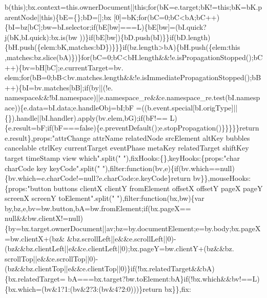 \begin{DoxyCode}
      b(\textcolor{keyword}{this});bx.context=this.ownerDocument||\textcolor{keyword}{this};\textcolor{keywordflow}{for}(bK=e.target;bK!=\textcolor{keyword}{this};bK=bK.parentNode||\textcolor{keyword}{this})\{bE=\{\};bD=[];bx
      [0]=bK;\textcolor{keywordflow}{for}(bC=0;bC<bA;bC++)\{bI=bz[bC];bw=bI.selector;\textcolor{keywordflow}{if}(bE[bw]===L)\{bE[bw]=(bI.quick?j(bK,bI.quick):bx.is(bw
      ))\}if(bE[bw])\{bD.push(bI)\}\}\textcolor{keywordflow}{if}(bD.length)\{bH.push(\{elem:bK,matches:bD\})\}\}\}\textcolor{keywordflow}{if}(bz.length>bA)\{bH.push(\{elem:\textcolor{keyword}{this}
      ,matches:bz.slice(bA)\})\}\textcolor{keywordflow}{for}(bC=0;bC<bH.length&&!e.isPropagationStopped();bC++)\{bv=bH[bC];e.currentTarget=bv.
      elem;\textcolor{keywordflow}{for}(bB=0;bB<bv.matches.length&&!e.isImmediatePropagationStopped();bB++)\{bI=bv.matches[bB];\textcolor{keywordflow}{if}(by||(!e.
      namespace&&!bI.namespace)||e.namespace\_re&&e.namespace\_re.test(bI.namespace))\{e.data=bI.data;e.handleObj=bI;bF
      =((b.event.special[bI.origType]||\{\}).handle||bI.handler).apply(bv.elem,bG);\textcolor{keywordflow}{if}(bF!==
      L)\{e.result=bF;\textcolor{keywordflow}{if}(bF===\textcolor{keyword}{false})\{e.preventDefault();e.stopPropagation()\}\}\}\}\}\textcolor{keywordflow}{return} e.result\},props:\textcolor{stringliteral}{"attrChange
       attrName relatedNode srcElement altKey bubbles cancelable ctrlKey currentTarget eventPhase metaKey
       relatedTarget shiftKey target timeStamp view which"}.split(\textcolor{stringliteral}{" "}),fixHooks:\{\},keyHooks:\{props:\textcolor{stringliteral}{"char charCode key
       keyCode"}.split(\textcolor{stringliteral}{" "}),filter:\textcolor{keyword}{function}(bv,e)\{\textcolor{keywordflow}{if}(bv.which==null)\{bv.which=e.charCode!=null?e.charCode:e.keyCode\}\textcolor{keywordflow}{return}
       bv\}\},mouseHooks:\{props:\textcolor{stringliteral}{"button buttons clientX clientY fromElement offsetX offsetY pageX pageY screenX
       screenY toElement"}.split(\textcolor{stringliteral}{" "}),filter:\textcolor{keyword}{function}(bx,bw)\{var by,bz,e,bv=bw.button,bA=bw.fromElement;\textcolor{keywordflow}{if}(bx.pageX==
      null&&bw.clientX!=null)\{by=bx.target.ownerDocument||av;bz=by.documentElement;e=by.body;bx.pageX=bw.clientX+(bz&
      &bz.scrollLeft||e&&e.scrollLeft||0)-(bz&&bz.clientLeft||e&&e.clientLeft||0);bx.pageY=bw.clientY+(bz&&bz.
      scrollTop||e&&e.scrollTop||0)-(bz&&bz.clientTop||e&&e.clientTop||0)\}\textcolor{keywordflow}{if}(!bx.relatedTarget&&bA)\{bx.relatedTarget=
      bA===bx.target?bw.toElement:bA\}\textcolor{keywordflow}{if}(!bx.which&&bv!==L)\{bx.which=(bv&1?1:(bv&2?3:(bv&4?2:0)))\}\textcolor{keywordflow}{return} bx\}\},fix:\textcolor{keyword}{
}
\end{DoxyCode}
